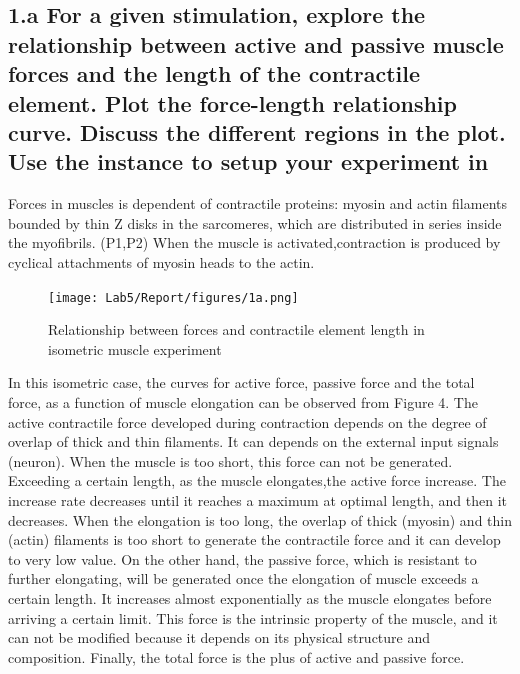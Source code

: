 \documentclass{cmc}
\begin{document}
\subsection*{1.a For a given stimulation, explore the relationship
  between active and passive muscle forces and the length of the
  contractile element.  Plot the force-length relationship curve.
  Discuss the different regions in the plot. Use the
   instance
  to setup your experiment in }


Forces in muscles is dependent of contractile proteins: myosin and actin filaments bounded by thin Z disks in the sarcomeres, which are distributed in series inside the myofibrils. (P1,P2) When the muscle is activated,contraction is produced by cyclical attachments of myosin heads to the actin.

\begin{figure}[H]
  \centering \texttt{[image: Lab5/Report/figures/1a.png]}
  \caption{Relationship between forces and contractile element length in isometric muscle experiment}
  \label{1a}
\end{figure}

In this isometric case, the curves for active force, passive force and the total force, as a function of muscle elongation can be observed from Figure 4.
The active contractile force developed during contraction depends on the degree of overlap of thick and thin filaments. 
It can depends on the external input signals (neuron). When the muscle is too short, this force can not be generated.
Exceeding a certain length, as the muscle elongates,the active force increase. The increase rate decreases until it reaches a maximum at optimal length, and then it decreases.
When the elongation is too long, the overlap of thick (myosin) and thin (actin) filaments is too short to generate the contractile force and it can develop to very low value.
On the other hand, the passive force, which is resistant to further elongating, will be generated once the elongation of muscle exceeds a certain length. It increases almost exponentially as the muscle elongates before arriving a certain limit. This force is the intrinsic property of the muscle, and it can not be modified because it depends on its physical structure and composition.
Finally, the total force is the plus of active and passive force. 
\end{document}
